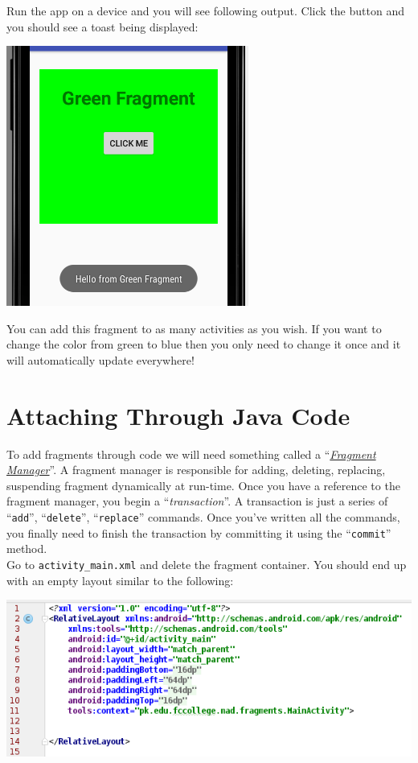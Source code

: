 Run the app on a device and you will see following output. Click the button and you should see a toast being displayed:

\begin{center}
	\includegraphics[scale=\FigureScale]{chapters/ch11/images/13}
\end{center}

You can add this fragment to as many activities as you wish. If you want to change the color from green to blue then you only need to change it once and it will automatically update everywhere!

\section{Attaching Through Java Code}
\label{FRAG:attachingThroughJava}
To add fragments through code we will need something called a ``\href{https://developer.android.com/guide/components/fragments.html#Transactions}{\textit{Fragment Manager}}''. A fragment manager is responsible for adding, deleting, replacing, suspending fragment dynamically at run-time. Once you have a reference to the fragment manager, you begin a ``\textit{transaction}''. A transaction is just a series of ``\texttt{add}'', ``\texttt{delete}'', ``\texttt{replace}'' commands. Once you've written all the commands, you finally need to finish the transaction by committing it using the ``\texttt{commit}'' method. \\

Go to \texttt{activity\_main.xml} and delete the fragment container. You should end up with an empty layout similar to the following:

\begin{center}
	\includegraphics[scale=\SourceCodeScale]{chapters/ch11/images/14}
\end{center}

